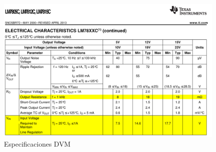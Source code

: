\documentclass[12pt,a4paper]{article}
\begin{document}
		\begin{figure}[H]
			\centering
				\includegraphics[scale=0.9]{attachments/lm7805c_specs2.pdf}\caption{Especificaciones DVM}
			\end{figure}
\end{document}
